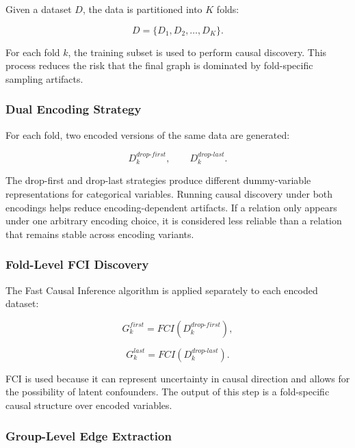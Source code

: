 \documentclass[conference, a4paper]{IEEEtran}
\begin{document}
Given a dataset $D$, the data is partitioned into $K$ folds:

\begin{equation}
D = \{D_1, D_2, \ldots, D_K\}.
\end{equation}

For each fold $k$, the training subset is used to perform causal discovery. This process reduces the risk that the final graph is dominated by fold-specific sampling artifacts.

\subsubsection{Dual Encoding Strategy}

For each fold, two encoded versions of the same data are generated:

\begin{equation}
D_k^{drop\text{-}first}, \qquad D_k^{drop\text{-}last}.
\end{equation}

The drop-first and drop-last strategies produce different dummy-variable representations for categorical variables. Running causal discovery under both encodings helps reduce encoding-dependent artifacts. If a relation only appears under one arbitrary encoding choice, it is considered less reliable than a relation that remains stable across encoding variants.

\subsubsection{Fold-Level FCI Discovery}

The Fast Causal Inference algorithm is applied separately to each encoded dataset:

\begin{equation}
G_k^{first} = FCI(D_k^{drop\text{-}first}),
\end{equation}

\begin{equation}
G_k^{last} = FCI(D_k^{drop\text{-}last}).
\end{equation}

FCI is used because it can represent uncertainty in causal direction and allows for the possibility of latent confounders. The output of this step is a fold-specific causal structure over encoded variables.

\subsubsection{Group-Level Edge Extraction}
\end{document}
